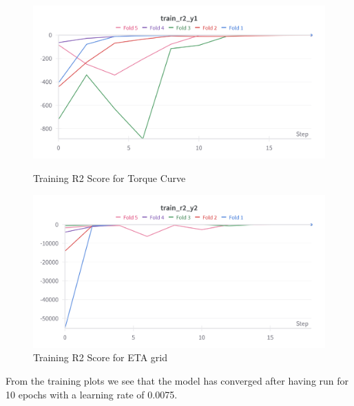 \documentclass{report} %
\begin{document}
\begin{figure}[h]
    \centering
    \begin{minipage}[b]{0.3\textwidth}
        \includegraphics[width=\textwidth]{./ReportImages/train_r2_y1.png}
        \caption{Training R2 Score for Torque Curve}
        \label{fig:Training R2 Score for Torque Curve}
    \end{minipage}
    \hfill
    \begin{minipage}[b]{0.3\textwidth}
        \includegraphics[width=\textwidth]{./ReportImages/train_r2_y2.png}
        \caption{Training R2 Score for ETA grid}
        \label{fig:Training R2 Score for ETA grid}
    \end{minipage}
\end{figure}

From the training plots we see that the model has converged after having run for 10 epochs with a learning rate of 0.0075.
\end{document}

